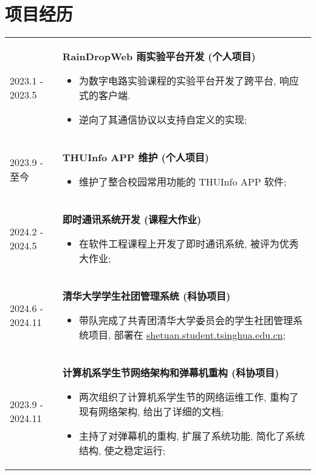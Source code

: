 \documentclass[a4paper, 10pt]{article}
\begin{document}
\section*{项目经历}
\noindent
\begin{tabular}{p{}p{}}
    2023.1 - 2023.5 & \textbf{RainDropWeb 雨实验平台开发 (个人项目)}
        \fontsize{8pt}{10pt}\selectfont
        \begin{itemize}[left=0pt,topsep=0pt,partopsep=0pt,parsep=0pt,itemsep=0pt]
            \item 为数字电路实验课程的实验平台开发了跨平台, 响应式的客户端.
            \item 逆向了其通信协议以支持自定义的实现;
        \end{itemize} \\

    2023.9 - 至今 & \textbf{THUInfo APP 维护 (个人项目)}
        \fontsize{8pt}{10pt}\selectfont
        \begin{itemize}[left=0pt,topsep=0pt,partopsep=0pt,parsep=0pt,itemsep=0pt]
            \item 维护了整合校园常用功能的 THUInfo APP 软件;
        \end{itemize} \\

    2024.2 - 2024.5 & \textbf{即时通讯系统开发 (课程大作业)}
        \fontsize{8pt}{10pt}\selectfont \begin{itemize}[left=0pt,topsep=0pt,partopsep=0pt,parsep=0pt,itemsep=0pt]
            \item 在软件工程课程上开发了即时通讯系统, 被评为优秀大作业;
        \end{itemize} \\

    2024.6 - 2024.11 & \textbf{清华大学学生社团管理系统 (科协项目)}
        \fontsize{8pt}{10pt}\selectfont \begin{itemize}[left=0pt,topsep=0pt,partopsep=0pt,parsep=0pt,itemsep=0pt]
            \item 带队完成了共青团清华大学委员会的学生社团管理系统项目, 部署在 \href{https://shetuan.student.tsinghua.edu.cn}{shetuan.student.tsinghua.edu.cn};
        \end{itemize} \\

    2023.9 - 2024.11 & \textbf{计算机系学生节网络架构和弹幕机重构 (科协项目)}
        \fontsize{8pt}{10pt}\selectfont \begin{itemize}[left=0pt,topsep=0pt,partopsep=0pt,parsep=0pt,itemsep=0pt]
            \item 两次组织了计算机系学生节的网络运维工作, 重构了现有网络架构, 给出了详细的文档;
            \item 主持了对弹幕机的重构, 扩展了系统功能, 简化了系统结构, 使之稳定运行;
        \end{itemize} \\


\end{tabular}
\end{document}
